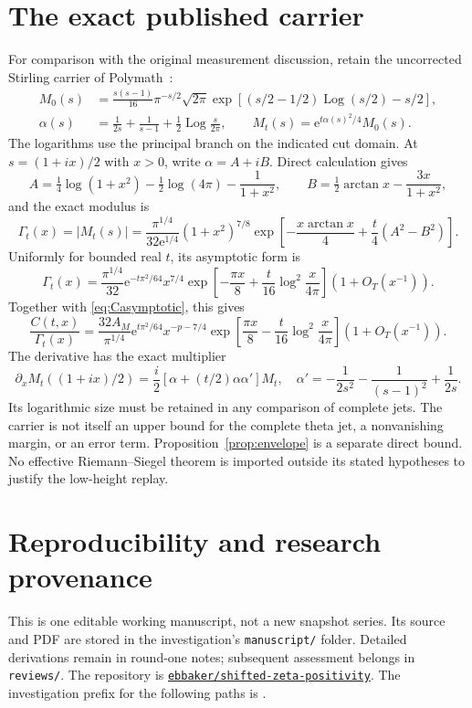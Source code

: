 \documentclass[11pt]{article}
\theoremstyle{remark}\newtheorem{remark}[theorem]{Remark}
\newcommand{\e}{\mathrm e}
\begin{document}
\section{The exact published carrier}\label{sec:carrier}
For comparison with the original measurement discussion, retain the uncorrected Stirling carrier of Polymath~\cite[eqs.~(6), (9), (10)]{polymath}:
\begin{align*}
 M_0(s)&=\frac{s(s-1)}{16}\pi^{-s/2}\sqrt{2\pi}
 \exp\left[(s/2-1/2)\operatorname{Log}(s/2)-s/2\right],\\
 \alpha(s)&=\frac1{2s}+\frac1{s-1}+\frac12\operatorname{Log}\frac{s}{2\pi},\qquad
 M_t(s)=\e^{t\alpha(s)^2/4}M_0(s).
\end{align*}
The logarithms use the principal branch on the indicated cut domain. At $s=(1+ix)/2$ with $x>0$, write $\alpha=A+iB$. Direct calculation gives
\[
 A=\tfrac14\log(1+x^2)-\tfrac12\log(4\pi)-\frac1{1+x^2},\qquad
 B=\tfrac12\arctan x-\frac{3x}{1+x^2},
\]
and the exact modulus is
\begin{equation}\label{eq:carrier}
 \Gamma_t(x)=|M_t(s)|=
 \frac{\pi^{1/4}}{32\e^{1/4}}(1+x^2)^{7/8}
 \exp\left[-\frac{x\arctan x}{4}+\frac t4(A^2-B^2)\right].
\end{equation}
Uniformly for bounded real $t$, its asymptotic form is
\[
 \Gamma_t(x)=\frac{\pi^{1/4}}{32}\e^{-t\pi^2/64}x^{7/4}
 \exp\left[-\frac{\pi x}{8}+\frac t{16}\log^2\frac{x}{4\pi}\right]
 (1+O_T(x^{-1})).
\]
Together with \eqref{eq:Casymptotic}, this gives
\[
 \frac{C(t,x)}{\Gamma_t(x)}=
 \frac{32A_M}{\pi^{1/4}}\e^{t\pi^2/64}x^{-p-7/4}
 \exp\left[\frac{\pi x}{8}-\frac t{16}\log^2\frac{x}{4\pi}\right]
 (1+O_T(x^{-1})).
\]
The derivative has the exact multiplier
\[
 \partial_xM_t((1+ix)/2)=\frac i2[\alpha+(t/2)\alpha\alpha']M_t,
 \quad \alpha'=-\frac1{2s^2}-\frac1{(s-1)^2}+\frac1{2s}.
\]
Its logarithmic size must be retained in any comparison of complete jets. The carrier is not itself an upper bound for the complete theta jet, a nonvanishing margin, or an error term. Proposition~\ref{prop:envelope} is a separate direct bound. No effective Riemann--Siegel theorem is imported outside its stated hypotheses to justify the low-height replay.

\section{Reproducibility and research provenance}\label{sec:records}
This is one editable working manuscript, not a new snapshot series. Its source and PDF are stored in the investigation's \texttt{manuscript/} folder. Detailed derivations remain in round-one notes; subsequent assessment belongs in \texttt{reviews/}. The repository is
\href{https://github.com/ebbaker/shifted-zeta-positivity}{\texttt{ebbaker/shifted-zeta-positivity}}.
The investigation prefix for the following paths is .
\end{document}
